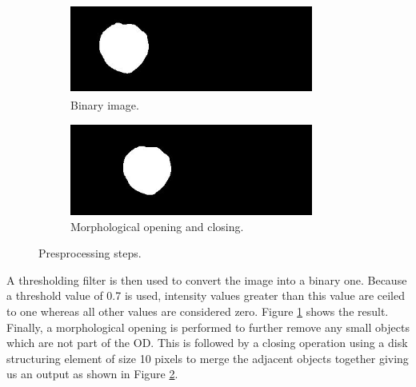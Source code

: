 \documentclass[12pt]{report}
\begin{document}
\begin{figure}[h]
\begin{subfigure}{.5\textwidth}
  \includegraphics[width = 8cm, height =3cm]{Capture7}
  \caption{Binary image.}
  \label{fig:sub5}
\end{subfigure}%
\begin{subfigure}{.5\textwidth}
  \centering
  \includegraphics[width = 8cm, height =3cm]{Capture8}
  \caption{Morphological opening and closing.}
  \label{fig:sub6}
\end{subfigure}
\caption{Presprocessing steps.}
\label{fig:test}
\end{figure}

\noindent A thresholding filter is then used to convert the image into a binary one. Because a threshold value of 0.7 is used, intensity values greater than this value are ceiled to one whereas all other values are considered zero. Figure \ref{fig:sub5} shows the result. Finally, a morphological opening is performed to further remove any small objects which are not part of the OD. This is followed by a closing operation using a disk structuring element of size 10 pixels to merge the adjacent objects together giving us an output as shown in Figure \ref{fig:sub6}.
\end{document}
